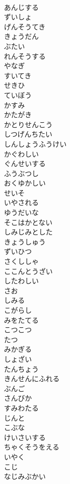\documentclass[8pt]{extreport}
\begin{document}
\begin{CJK}{UTF8}{min}
\\	あんじする
\\	ずいしょ
\\	げんそうてき
\\	きょうだん
\\	ぶたい
\\	れんそうする
\\	やなぎ
\\	すいてき
\\	せきひ
\\	ていぼう
\\	かすみ
\\	かたがき
\\	かとりせんこう
\\	しつげんちたい
\\	しんしょうふうけい
\\	かぐわしい
\\	ぐんせいする
\\	ふうぶつし
\\	おくゆかしい
\\	せいそ
\\	いやされる
\\	ゆうだいな
\\	そこはかとない
\\	しみじみとした
\\	きょうしゅう
\\	ずいひつ
\\	さくししゃ
\\	ここんとうざい
\\	したわしい
\\	さお
\\	しみる
\\	こがらし
\\	みをたてる
\\	こつこつ
\\	たつ
\\	みかぎる
\\	しょざい
\\	たんちょう
\\	きんせんにふれる
\\	ぶんご
\\	さんびか
\\	すみわたる
\\	じんと
\\	こぶな
\\	けいさいする
\\	ちゃくそうをえる
\\	いやく
\\	こじ
\\	なじみぶかい

\end{CJK}
\end{document}
